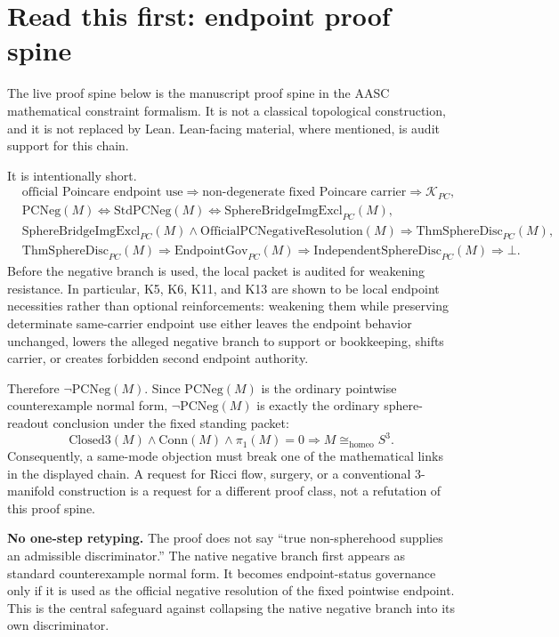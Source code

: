 \documentclass[11pt]{article}
\newcommand{\Sthree}{S^{3}}
\newcommand{\ClosedThree}{\mathrm{Closed3}}
\newcommand{\Conn}{\mathrm{Conn}}
\newcommand{\KPC}{\mathcal{K}_{PC}}
\newcommand{\OfficialPCNegativeResolution}{\mathrm{OfficialPCNegativeResolution}}
\newcommand{\PCNeg}{\mathrm{PCNeg}}
\newcommand{\StdPCNeg}{\mathrm{StdPCNeg}}
\newcommand{\SphereBridgeImgExcl}{\mathrm{SphereBridgeImgExcl}_{PC}}
\newcommand{\ThmSphereDisc}{\mathrm{ThmSphereDisc}_{PC}}
\newcommand{\EndpointGov}{\mathrm{EndpointGov}_{PC}}
\newcommand{\IndependentSphereDisc}{\mathrm{IndependentSphereDisc}_{PC}}
\newcommand{\Homeo}{\cong_{\mathrm{homeo}}}
\begin{document}
\section*{Read this first: endpoint proof spine}

The live proof spine below is the manuscript proof spine in the AASC mathematical constraint formalism. It is not a classical topological construction, and it is not replaced by Lean. Lean-facing material, where mentioned, is audit support for this chain.

It is intentionally short.
\[
\begin{aligned}
&\text{official Poincare endpoint use}\Rightarrow \text{non-degenerate fixed Poincare carrier}\Rightarrow \KPC,\\
&\PCNeg(M)\Longleftrightarrow \StdPCNeg(M)\Longleftrightarrow \SphereBridgeImgExcl(M),\\
&\SphereBridgeImgExcl(M)\wedge \OfficialPCNegativeResolution(M)\Rightarrow \ThmSphereDisc(M),\\
&\ThmSphereDisc(M)\Rightarrow \EndpointGov(M)\Rightarrow \IndependentSphereDisc(M)\Rightarrow \bot.
\end{aligned}
\]
Before the negative branch is used, the local packet is audited for weakening resistance. In particular, K5, K6, K11, and K13 are shown to be local endpoint necessities rather than optional reinforcements: weakening them while preserving determinate same-carrier endpoint use either leaves the endpoint behavior unchanged, lowers the alleged negative branch to support or bookkeeping, shifts carrier, or creates forbidden second endpoint authority.

Therefore \(\neg\PCNeg(M)\). Since \(\PCNeg(M)\) is the ordinary pointwise counterexample normal form, \(\neg\PCNeg(M)\) is exactly the ordinary sphere-readout conclusion under the fixed standing packet:
\[
\ClosedThree(M)\wedge\Conn(M)\wedge\pi_1(M)=0\Longrightarrow M\Homeo\Sthree.
\]
Consequently, a same-mode objection must break one of the mathematical links in the displayed chain. A request for Ricci flow, surgery, or a conventional 3-manifold construction is a request for a different proof class, not a refutation of this proof spine.

\begin{mdframed}[backgroundcolor=gray!8,linewidth=0.6pt]
\textbf{No one-step retyping.} The proof does not say ``true non-spherehood supplies an admissible discriminator.'' The native negative branch first appears as standard counterexample normal form. It becomes endpoint-status governance only if it is used as the official negative resolution of the fixed pointwise endpoint. This is the central safeguard against collapsing the native negative branch into its own discriminator.
\end{mdframed}
\end{document}
